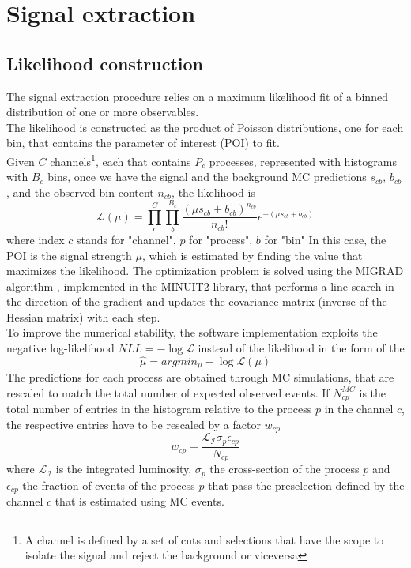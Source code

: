 \section{Signal extraction}
\subsection{Likelihood construction}
The signal extraction procedure relies on a maximum likelihood fit of a binned distribution of one or more observables.\\
The likelihood is constructed as the product of Poisson distributions, one for each bin, that contains the parameter of interest (POI) to fit.\\
Given $C$ channels\footnote{A channel is defined by a set of cuts and selections that have the scope to isolate the signal and reject the background or viceversa}, each that contains $P_c$ processes, represented with histograms with $B_c$ bins, once we have the signal and the background MC predictions $s_{cb}$, $b_{cb}$, and the observed bin content $n_{cb}$, the likelihood is \cite{Khachatryan2015PreciseTeV}
\begin{equation}
    \mathcal{L}(\mu)=\prod_c^C \prod_b^{B_c} \frac{(\mu s_{cb}+b_{cb})^{n_{cb}}}{n_{cb}!} e^{-(\mu s_{cb}+b_{cb})}
\end{equation}
where index $c$ stands for "channel", $p$ for "process", $b$ for "bin"
In this case, the POI is the signal strength $\mu$, which is estimated by finding the value that maximizes the likelihood. The optimization problem is solved using the \textsc{MIGRAD} algorithm \cite{James1998MINUIT:Manual}, implemented in the \textsc{MINUIT2} library, that performs a line search in the direction of the gradient and updates the covariance matrix (inverse of the Hessian matrix) with each step.\\
To improve the numerical stability, the software implementation exploits the negative log-likelihood $\textit{NLL}=-\log{\mathcal{L}}$ instead of the likelihood in the form of the   
\begin{equation*}
    \hat{\mu}=argmin_\mu - \log{\mathcal{L}(\mu)}
\end{equation*}
The predictions for each process are obtained through MC simulations, that are rescaled to match the total number of expected observed events. If $N^{MC}_{cp}$ is the total number of entries in the histogram relative to the process $p$ in the channel $c$, the respective entries have to be rescaled by a factor $w_{cp}$
\begin{equation}
    w_{cp}=\frac{\mathcal{L_I} \sigma_p \epsilon_{cp}}{N_{cp}}
\end{equation}
where $\mathcal{L_I}$ is the integrated luminosity, $\sigma_p$ the cross-section of the process $p$ and $\epsilon_{cp}$ the fraction of events of the process $p$ that pass the preselection defined by the channel $c$ that is estimated using MC events. 
\\
\newpage
